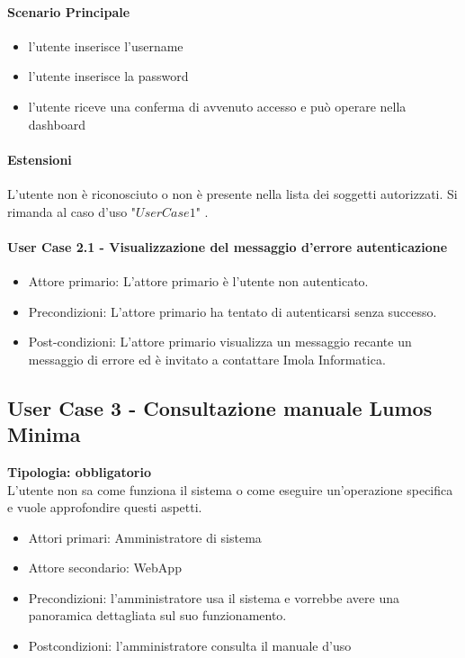 \documentclass[12pt]{article}
\begin{document}
\paragraph{Scenario Principale}
\begin{itemize}
	\item l'utente inserisce l'username
	\item l'utente inserisce la password
	\item l'utente riceve una conferma di avvenuto accesso e può operare nella dashboard
\end{itemize}

\paragraph{Estensioni} L'utente non è riconosciuto o non è presente nella lista dei soggetti autorizzati. Si rimanda al caso d'uso "$User Case 1$" .

\paragraph{User Case 2.1 - Visualizzazione del messaggio d'errore autenticazione}
\begin{itemize}
	\item Attore primario: L'attore primario è l'utente non autenticato.
	\item Precondizioni: L'attore primario ha tentato di autenticarsi senza successo.
	\item Post-condizioni: L'attore primario visualizza un messaggio recante un messaggio di errore ed è invitato a contattare Imola Informatica.
\end{itemize}

\subsection{User Case 3 - Consultazione manuale Lumos Minima}
\textbf{Tipologia: obbligatorio}\\
L'utente non sa come funziona il sistema o come eseguire un'operazione specifica e vuole approfondire questi aspetti.
\begin{itemize}
	\item Attori primari: Amministratore di sistema
	\item Attore secondario: WebApp
	\item Precondizioni: l'amministratore usa il sistema e vorrebbe avere una panoramica dettagliata sul suo funzionamento.
	\item Postcondizioni: l'amministratore consulta il manuale d'uso
\end{itemize}
\end{document}
